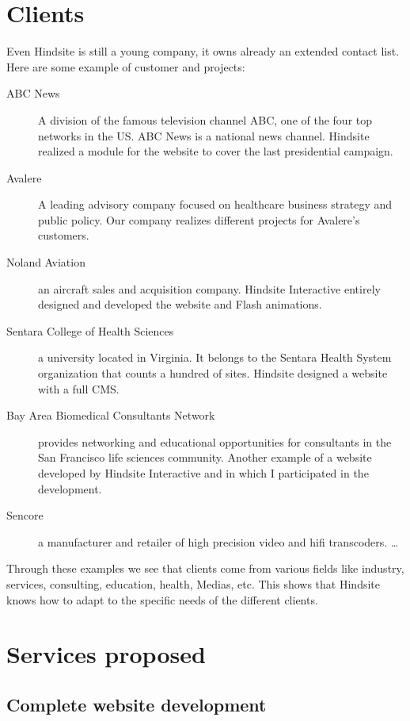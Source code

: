 \section{Clients}

Even Hindsite is still a young company, it owns already an extended contact
list. Here are some example of customer and projects:


\begin{description}
  \item[ABC News]A division of the famous television channel ABC, one of the
four top networks in the US. ABC News is a national news channel. Hindsite
realized a module for the website to cover the last presidential campaign.
  \item[Avalere]A leading advisory company focused on healthcare business
strategy and public policy. Our company realizes different projects for
Avalere’s customers.
  \item[Noland Aviation] an aircraft sales and acquisition company. Hindsite
Interactive entirely designed and developed the website and Flash animations.
  \item[Sentara College of Health Sciences] a university located in Virginia. It
belongs to the Sentara Health System organization that counts a hundred of
sites. Hindsite designed a website with a full CMS.
  \item[Bay Area Biomedical Consultants Network] provides
networking and educational opportunities for consultants in the San Francisco
life sciences community. Another example of a website developed by Hindsite
Interactive and in which I participated in the development.
  \item[Sencore] a manufacturer and retailer of high precision video and hifi transcoders.
\ldots
\end{description}


Through these examples we see that clients come from various fields like
industry, services, consulting, education, health, Medias, etc.
This shows that Hindsite knows how to adapt to the specific needs of the
different clients.

\section{Services proposed}

\subsection{Complete website development}

